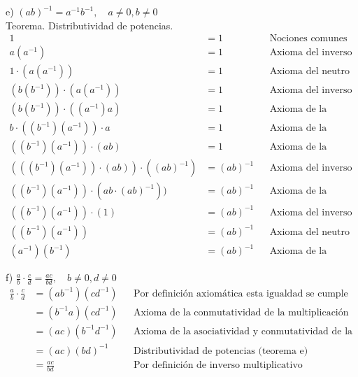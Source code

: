 \documentclass{article}
\begin{document}
e) \quad \((ab)^{-1} = a^{-1}b^{-1}, \quad a\neq 0, b\neq 0 \) \\
Teorema. Distributividad de potencias.\\
\begin{align*}
    1 &= 1 && \text{Nociones comunes de Euclides} \\
    a(a^{-1}) &= 1 && \text{Axioma del inverso multiplicativo} \\
    1 \cdot (a(a^{-1})) &= 1 && \text{Axioma del neutro multiplicativo} \\
    (b(b^{-1})) \cdot (a(a^{-1})) &= 1 && \text{Axioma del inverso multiplicativo} \\
    (b(b^{-1})) \cdot ((a^{-1})a) &= 1 && \text{Axioma de la conmutatividad de la multiplicación} \\
    b \cdot ((b^{-1})(a^{-1})) \cdot a &= 1 && \text{Axioma de la asociatividad de la multiplicación} \\
    ((b^{-1})(a^{-1})) \cdot (ab) &= 1 && \text{Axioma de la conmutatividad de la multiplicación} \\
    (((b^{-1})(a^{-1})) \cdot (ab)) \cdot ((ab)^{-1}) &= (ab)^{-1} && \text{Axioma del inverso multiplicativo y el neutro multiplicativo} \\
    ((b^{-1})(a^{-1})) \cdot (ab \cdot (ab)^{-1})) &= (ab)^{-1} && \text{Axioma de la asociatividad de la multiplicación} \\
    ((b^{-1})(a^{-1})) \cdot (1)&= (ab)^{-1} && \text{Axioma del inverso multiplicativo} \\
    ((b^{-1})(a^{-1})) &= (ab)^{-1} && \text{Axioma del neutro multiplicativo} \\
    (a^{-1})(b^{-1}) &= (ab)^{-1} && \text{Axioma de la conmutatividad de la multiplicación}
\end{align*}

f) \quad \( \frac{a}{b} \cdot \frac{c}{d} = \frac{ac}{bd}, \quad b\neq 0, d\neq 0 \) \\
\begin{align*}
    \frac{a}{b} \cdot \frac{c}{d} &= (ab^{-1})(cd^{-1}) && \text{Por definición axiomática esta igualdad se cumple} \\
    &= (b^{-1}a)(cd^{-1}) && \text{Axioma de la conmutatividad de la multiplicación} \\
    &= (ac)(b^{-1}d^{-1}) && \text{Axioma de la asociatividad y conmutatividad de la multiplicación} \\
    &= (ac)(bd)^{-1} && \text{Distributividad de potencias (teorema e)} \\
    &= \frac{ac}{bd} && \text{Por definición de inverso multiplicativo} \\
\end{align*}
\end{document}
